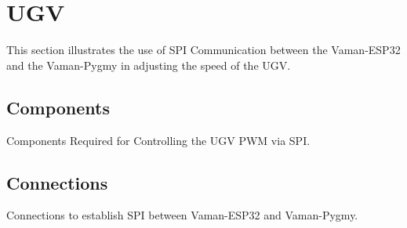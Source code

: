 \section{UGV}
This section illustrates the use of SPI Communication between the Vaman-ESP32
and the Vaman-Pygmy in adjusting the speed of the UGV.

\subsection{Components}
\begin{table}[!ht]
    \centering
    
    \caption{Components Required for Controlling the UGV PWM via SPI.}
    \label{tab:pwm-ugv-components}
\end{table}

\subsection{Connections}
\begin{table}[!ht]
    \centering
    
    \caption{Connections to establish SPI between Vaman-ESP32 and Vaman-Pygmy.}
    \label{tab:pwm-ugv-connections}
\end{table}

